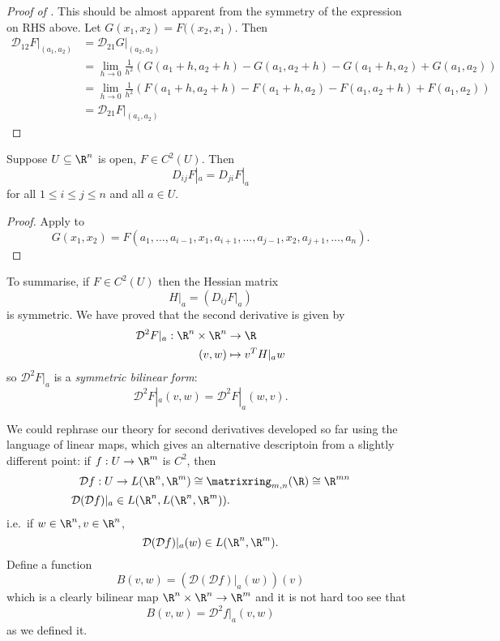 \documentclass[a4paper]{article}
\newcommand*{\D}{\mathcal{D}}
\theoremstyle{definition}
\begin{document}
\begin{proof}[Proof of ]
  This should be almost apparent from the symmetry of the expression on RHS above. Let \(G(x_1, x_2) = F((x_2, x_1)\). Then
  \begin{align*}
    \D_{12} F|_{(a_1, a_2)} &= \D_{21} G|_{(a_2, a_2)} \\
                            &= \lim_{h \to 0} \frac{1}{h^2} \left( G(a_1 + h, a_2 + h) - G(a_1, a_2 + h) - G(a_1 + h, a_2) + G(a_1, a_2) \right) \\
                            &= \lim_{h \to 0} \frac{1}{h^2} \left( F(a_1 + h, a_2 + h) - F(a_1 + h, a_2) - F(a_1, a_2 + h) + F(a_1, a_2) \right) \\
                            &= \D_{21} F|_{(a_1, a_2)}
 \end{align*}
\end{proof}

\begin{corollary}
  Suppose \(U \subseteq \R^n\) is open, \(F \in C^2(U)\). Then
  \[
    D_{ij} F|_a = D_{ji} F|_a
  \]
  for all \(1 \leq i \leq j \leq n\) and all \(a \in U\).
\end{corollary}

\begin{proof}
  Apply  to
  \[
    G(x_1, x_2) = F(a_1, \dots, a_{i - 1}, x_1, a_{i + 1}, \dots, a_{j - 1}, x_2, a_{j + 1}, \dots, a_n).
  \]
\end{proof}

To summarise, if \(F \in C^2(U)\) then the Hessian matrix
\[
  H|_a = \left( D_{ij} F|_a \right)
\]
is symmetric. We have proved that the second derivative is given by
\begin{align*}
  \D^2 F|_a: \R^n \times \R^n &\to \R \\
  (v, w) &\mapsto v^T H|_a w
\end{align*}
so \(\D^2 F|_a\) is a \emph{symmetric bilinear form}:
\[
  \D^2 F|_a(v, w) = \D^2 F|_a(w, v).
\]

We could rephrase our theory for second derivatives developed so far using the language of linear maps, which gives an alternative descriptoin from a slightly different point: if \(f: U \to \R^m\) is \(C^2\), then
\begin{align*}
  \D f: U &\to L(\R^n, \R^m) \cong \matrixring_{m, n}(\R) \cong \R^{mn} \\
  \D (\D f)|_a &\in L(\R^n, L(\R^n, \R^m)).
\end{align*}
i.e.\ if \(w \in \R^n, v \in \R^n\),
\[
  \D (\D f)|_a (w) \in L(\R^n, \R^m).
\]
Define a function
\[
  B(v, w) = (\D( \D f)|_a (w))(v)
\]
which is a clearly bilinear map \(\R^n \times \R^n \to \R^m\) and it is not hard too see that
\[
  B(v, w) = \D^2 f|_a (v, w)
\]
as we defined it.
\end{document}
